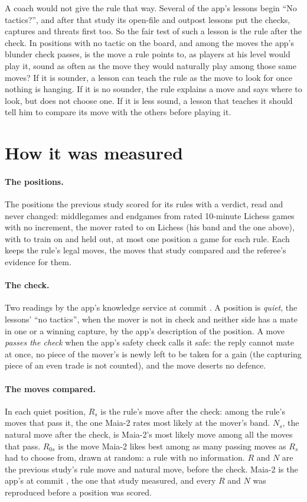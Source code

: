 \documentclass[11pt]{article}
\begin{document}
A coach would not give the rule that way. Several of the app's lessons begin ``No tactics?'', and
after that study its open-file and outpost lessons put the checks, captures and threats first too.
So the fair test of such a lesson is the rule after the check. In positions with no tactic on the
board, and among the moves the app's blunder check passes, is the move a rule points to, as players
at his level would play it, sound as often as the move they would naturally play among those same
moves? If it is sounder, a lesson can teach the rule as the move to look for once nothing is
hanging. If it is no sounder, the rule explains a move and says where to look, but does not choose
one. If it is less sound, a lesson that teaches it should tell him to compare its move with the
others before playing it.

\section{How it was measured}

\paragraph{The positions.} The \Inherited{} positions the previous study scored for its \NRules{}
rules with a verdict, read and never changed: middlegames and endgames from rated 10-minute Lichess
games with no increment, the mover rated \BandLow{} to \BandHigh{} on Lichess (his band and the one
above), with \TrainMonths{} to train on and \HeldMonth{} held out, at most one position a game for
each rule. Each keeps the rule's legal moves, the moves that study compared and the referee's
evidence for them.

\paragraph{The check.} Two readings by the app's knowledge service at commit \texttt{\CheckCommit}.
A position is \emph{quiet}, the lessons' ``no tactics'', when the mover is not in check and neither
side has a mate in one or a winning capture, by the app's description of the position. A move
\emph{passes the check} when the app's safety check calls it safe: the reply cannot mate at once, no
piece of the mover's is newly left to be taken for a gain (the capturing piece of an even trade is
not counted), and the move deserts no defence.

\paragraph{The moves compared.} In each quiet position, $R_s$ is the rule's move after the check:
among the rule's moves that pass it, the one Maia-2 rates most likely at the mover's band. $N_s$,
the natural move after the check, is Maia-2's most likely move among all the moves that pass.
$R_{0s}$ is the move Maia-2 likes best among as many passing moves as $R_s$ had to choose from,
drawn at random: a rule with no information. $R$ and $N$ are the previous study's rule move and
natural move, before the check. Maia-2 is the app's at commit \texttt{\ScoreCommit}, the one that
study measured, and every $R$ and $N$ was reproduced before a position was scored.
\end{document}
